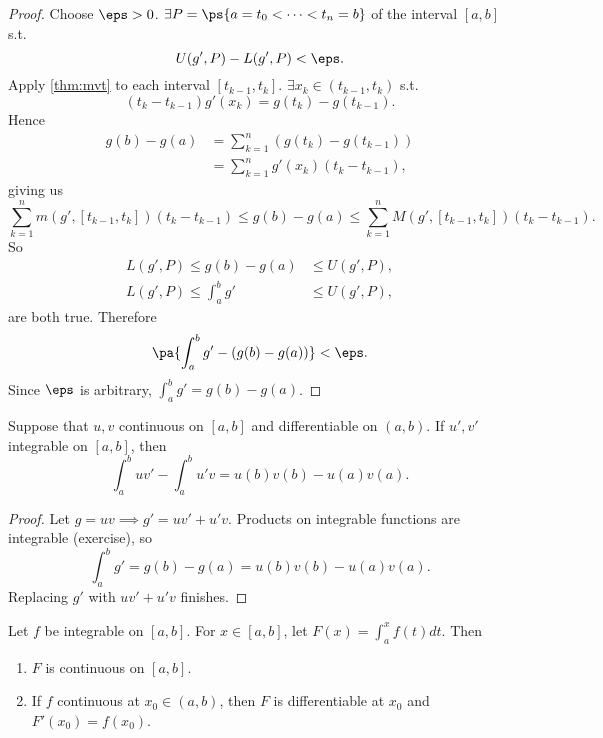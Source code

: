 \documentclass[11pt]{scrartcl}
\numberwithin{equation}{section}
\begin{document}
\begin{proof}
    Choose $\eps>0$. $\exists P=\ps{a=t_0<\cdots<t_n=b}$ of the interval 
    $[a,b]$ s.t. 
    \[
        U(g',P) - L(g',P) < \eps.
    \]
    Apply \cref{thm:mvt} to each interval $[t_{k-1},t_k]$.
    $\exists x_k\in (t_{k-1}, t_k)$ s.t. 
    \[
        (t_k-t_{k-1})g'(x_k) = g(t_k) - g(t_{k-1}).
    \]
    Hence 
    \begin{align*}
        g(b)-g(a) &= \sum_{k=1}^{n}(g(t_k) - g(t_{k-1})) \\
        &= \sum_{k=1}^{n}g'(x_k)(t_k-t_{k-1}),
    \end{align*}
    giving us 
    \[
        \sum_{k=1}^{n}m(g',[t_{k-1}, t_k])(t_k-t_{k-1}) \leq g(b)-g(a) \leq \sum_{k=1}^{n}M(g',[t_{k-1}, t_k])(t_k-t_{k-1}).
    \]
    So
    \begin{align*}
        L(g',P) \leq g(b)-g(a) &\leq  U(g',P), \\
        L(g',P) \leq \int_{a}^{b}g' &\leq  U(g',P),
    \end{align*}
    are both true. 
    Therefore 
    \[
        \pa{\int_{a}^{b}g' - (g(b)-g(a))} < \eps.
    \]
    Since $\eps$ is arbitrary, $\int_{a}^{b}g'=g(b)-g(a)$.
\end{proof}

\begin{theorem}
    \label{thm:intbyparts}
    Suppose that $u,v$ continuous on $[a,b]$ and differentiable on $(a,b)$.
    If $u', v'$ integrable on $[a,b]$, then 
    \[
        \int_{a}^{b}uv' - \int_{a}^{b}u'v = 
        u(b)v(b)-u(a)v(a).
    \]
\end{theorem}

\begin{proof}
    Let $g=uv \implies g'=uv'+u'v$. Products on integrable functions 
    are integrable (exercise), so 
    \[
        \int_{a}^{b}g' = g(b)-g(a) = u(b)v(b) - u(a)v(a).
    \]
    Replacing $g'$ with $uv'+u'v$ finishes.
\end{proof}

\begin{theorem}
    \label{thm:fundthmcalc2}
    Let $f$ be integrable on $[a,b]$. For $x\in[a,b]$, let 
    $F(x) = \int_{a}^{x}f(t)dt$. Then 
    \begin{enumerate}
        \item $F$ is continuous on $[a,b]$.
        \item If $f$ continuous at $x_0\in(a,b)$, then $F$ is differentiable 
        at $x_0$ and $F'(x_0) = f(x_0)$.
    \end{enumerate}
\end{theorem}
\end{document}
